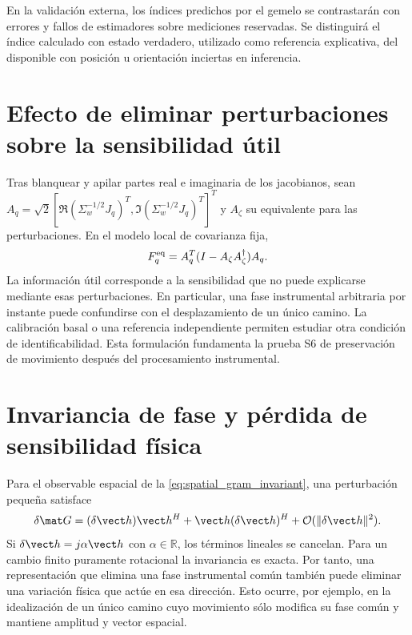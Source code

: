 En la validación externa, los índices predichos por el gemelo se contrastarán
con errores y fallos de estimadores sobre mediciones reservadas. Se distinguirá
el índice calculado con estado verdadero, utilizado como referencia explicativa,
del disponible con posición u orientación inciertas en inferencia.

\section{Efecto de eliminar perturbaciones sobre la sensibilidad útil}

Tras blanquear y apilar partes real e imaginaria de los jacobianos, sean
$A_q=\sqrt{2}[\Re(\Sigma_w^{-1/2}J_q)^T,
\Im(\Sigma_w^{-1/2}J_q)^T]^T$ y $A_\zeta$ su equivalente para las
perturbaciones. En el modelo local de covarianza fija,
\begin{equation}
F_q^{\rm eq}=A_q^T(I-A_\zeta A_\zeta^\dagger)A_q.
\end{equation}
La información útil corresponde a la sensibilidad que no puede explicarse
mediante esas perturbaciones. En particular, una fase instrumental arbitraria
por instante puede confundirse con el desplazamiento de un único camino.
La calibración basal o una referencia independiente permiten estudiar otra
condición de identificabilidad. Esta formulación fundamenta la prueba S6 de
preservación de movimiento después del procesamiento instrumental.


\section{Invariancia de fase y pérdida de sensibilidad física}
\label{sec:invariance_sensing_limit}

Para el observable espacial de la \cref{eq:spatial_gram_invariant}, una
perturbación pequeña satisface
\begin{equation}
\delta\mat G=(\delta\vect h)\vect h^H+\vect h(\delta\vect h)^H
+\mathcal O(\|\delta\vect h\|^2).
\end{equation}
Si $\delta\vect h=j\alpha\vect h$ con $\alpha\in\mathbb R$, los términos
lineales se cancelan. Para un cambio finito puramente rotacional la invariancia
es exacta. Por tanto, una representación que elimina una fase instrumental
común también puede eliminar una variación física que actúe en esa dirección.
Esto ocurre, por ejemplo, en la idealización de un único camino cuyo movimiento
sólo modifica su fase común y mantiene amplitud y vector espacial.

